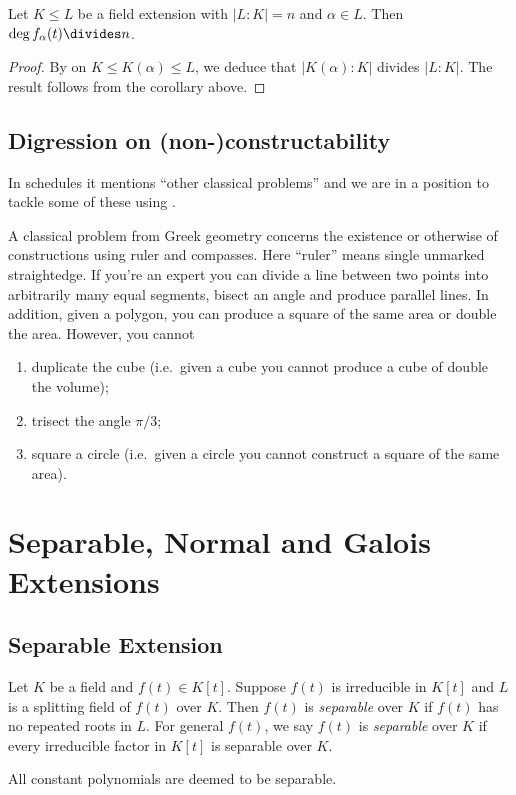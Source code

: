 \documentclass[a4paper]{article}
\begin{document}
\begin{corollary}
  \label{cor:divisibility of extension}
  Let \(K \leq L\) be a field extension with \(|L:K| = n\) and \(\alpha \in L\). Then \(\deg f_\alpha(t) \divides n\).
\end{corollary}

\begin{proof}
  By  on \(K \leq K(\alpha) \leq L\), we deduce that \(|K(\alpha):K|\) divides \(|L:K|\). The result follows from the corollary above.
\end{proof}

\subsection{Digression on (non-)constructability}

In schedules it mentions ``other classical problems'' and we are in a position to tackle some of these using .

A classical problem from Greek geometry concerns the existence or otherwise of constructions using ruler and compasses. Here ``ruler'' means single unmarked straightedge. If you're an expert you can divide a line between two points into arbitrarily many equal segments, bisect an angle and produce parallel lines. In addition, given a polygon, you can produce a square of the same area or double the area. However, you cannot
\begin{enumerate}
\item duplicate the cube (i.e.\ given a cube you cannot produce a cube of double the volume);
\item trisect the angle \(\pi/3\);
\item square a circle (i.e.\ given a circle you cannot construct a square of the same area).
\end{enumerate}




\blindtext

\section{Separable, Normal and Galois Extensions}

\subsection{Separable Extension}

\begin{definition}
  Let \(K\) be a field and \(f(t) \in K[t]\). Suppose \(f(t)\) is irreducible in \(K[t]\) and \(L\) is a splitting field of \(f(t)\) over \(K\). Then \(f(t)\) is \emph{separable} over \(K\) if \(f(t)\) has no repeated roots in \(L\). For general \(f(t)\), we say \(f(t)\) is \emph{separable} over \(K\) if every irreducible factor in \(K[t]\) is separable over \(K\).

  All constant polynomials are deemed to be separable.
\end{definition}
\end{document}
